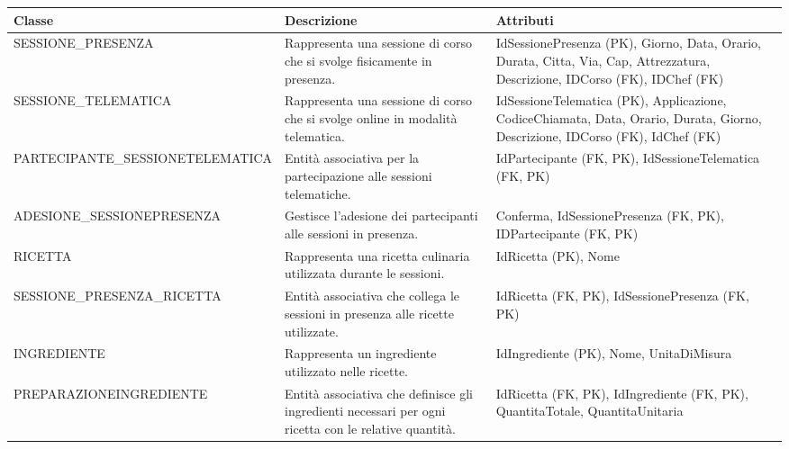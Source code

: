 \begin{center}
\begin{tcolorbox}[colback=white!98!gray, colframe=myblue!80!black, title=Dizionario delle Classi (Entità) - Parte 2, arc=4mm, boxrule=0.8pt, width=0.98\textwidth]
\renewcommand{\arraystretch}{1.2}
\begin{tabularx}{\textwidth}{p{3.2cm}p{4.8cm}X}
\textbf{Classe} & \textbf{Descrizione} & \textbf{Attributi} \\
\hline
SESSIONE\_\-PRESENZA & Rappresenta una sessione di corso che si svolge fisicamente in presenza. & IdSessionePresenza (PK), Giorno, Data, Orario, Durata, Citta, Via, Cap, Attrezzatura, Descrizione, IDCorso (FK), IDChef (FK) \\
\hline
SESSIONE\_\-TELEMATICA & Rappresenta una sessione di corso che si svolge online in modalità telematica. & IdSessioneTelematica (PK), Applicazione, CodiceChiamata, Data, Orario, Durata, Giorno, Descrizione, IDCorso (FK), IdChef (FK) \\
\hline
PARTECIPANTE\_\-SESSIONETE\-LEMATICA & Entità associativa per la partecipazione alle sessioni telematiche. & IdPartecipante (FK, PK), IdSessioneTelematica (FK, PK) \\
\hline
ADESIONE\_\-SESSIONEPRE\-SENZA & Gestisce l'adesione dei partecipanti alle sessioni in presenza. & Conferma, IdSessionePresenza (FK, PK), IDPartecipante (FK, PK) \\
\hline
RICETTA & Rappresenta una ricetta culinaria utilizzata durante le sessioni. & IdRicetta (PK), Nome \\
\hline
SESSIONE\_\-PRESENZA\_\-RICETTA & Entità associativa che collega le sessioni in presenza alle ricette utilizzate. & IdRicetta (FK, PK), IdSessionePresenza (FK, PK) \\
\hline
INGREDIENTE & Rappresenta un ingrediente utilizzato nelle ricette. & IdIngrediente (PK), Nome, UnitaDiMisura \\
\hline
PREPARAZIONE\-INGREDIENTE & Entità associativa che definisce gli ingredienti necessari per ogni ricetta con le relative quantità. & IdRicetta (FK, PK), IdIngrediente (FK, PK), QuantitaTotale, QuantitaUnitaria \\
\hline
\end{tabularx}
\end{tcolorbox}
\end{center}


